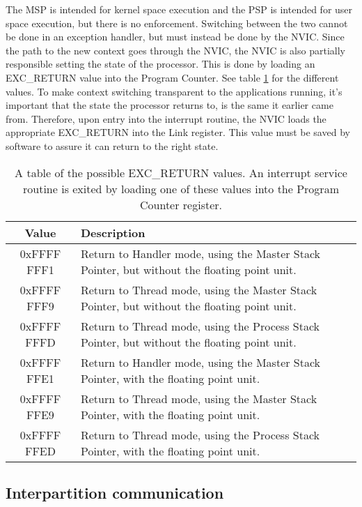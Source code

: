 The MSP is intended for kernel space execution and the PSP is intended for user space execution, but there is no enforcement.
Switching between the two cannot be done in an exception handler, but must instead be done by the NVIC.
Since the path to the new context goes through the NVIC, the NVIC is also partially responsible setting the state of the processor.
This is done by loading an EXC\_RETURN value into the Program Counter. See table \ref{tab:exc-return} for the different values.
To make context switching transparent to the applications running, it's important that the state the processor returns to, is the
same it earlier came from. Therefore, upon entry into the interrupt routine, the NVIC loads the appropriate EXC\_RETURN into the Link
register. This value must be saved by software to assure it can return to the right state.
\begin{table}[H]
	\centering
	\begin{tabular}{|c|p{10cm}|}
		\hline
		Value			&	Description 	\\
		\hline
		0xFFFF FFF1 	&	Return to Handler mode, using the Master Stack Pointer, but without the floating point unit.	\\
		\hline
		0xFFFF FFF9		&	Return to Thread mode, using the Master Stack Pointer, but without the floating point unit.		\\
		\hline
		0xFFFF FFFD		&	Return to Thread mode, using the Process Stack Pointer, but without the floating point unit.	\\
		\hline
		0xFFFF FFE1		&	Return to Handler mode, using the Master Stack Pointer, with the floating point unit.			\\
		\hline
		0xFFFF FFE9		&	Return to Thread mode, using the Master Stack Pointer, with the floating point unit.			\\
		\hline
		0xFFFF FFED		&	Return to Thread mode, using the Process Stack Pointer, with the floating point unit.			\\
		\hline
	\end{tabular}
	\caption{
		A table of the possible EXC\_RETURN values. An interrupt service routine is exited by loading one of these values into the Program Counter register.	}
	\label{tab:exc-return}
\end{table}

\subsection{Interpartition communication}


